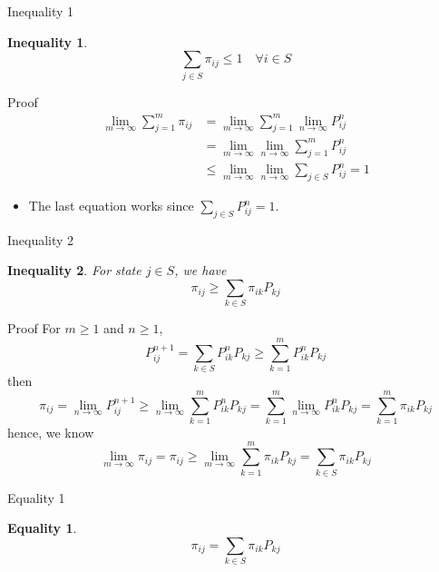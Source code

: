 \documentclass[mathserif]{beamer}
\newtheorem{ineq}{Inequality}
\newtheorem{eq}{Equality}
\begin{document}
\begin{frame}{Inequality 1}
	\begin{ineq}
		\[
		\sum_{j \in S} \pi_{ij} \leq 1 \quad\forall i \in S
		\]
	\end{ineq}
\end{frame}

\begin{frame}{Proof}
		\begin{align*}
			\lim_{m \to \infty} \sum_{j=1}^m \pi_{ij} &= \lim_{m \to \infty} \sum_{j=1}^m \lim_{n \to \infty} P^n_{ij} \\
			&= \lim_{m \to \infty} \lim_{n \to \infty} \sum_{j=1}^m P^n_{ij} \\
			&\leq \lim_{m \to \infty} \lim_{n \to \infty} \sum_{j \in S} P^n_{ij} = 1
		\end{align*}
	\begin{itemize}
		\item The last equation works since $\sum_{j \in S} P^n_{ij} = 1$.
	\end{itemize}
\end{frame}

\begin{frame}{Inequality 2}
	\begin{ineq}
		For state $j \in S$, we have
		\[
		\pi_{ij} \geq \sum_{k \in S} \pi_{ik} P_{kj}
		\]
	\end{ineq}
\end{frame}

\begin{frame}{Proof}
	For $m \geq 1$ and $n \geq 1$,
	\[
	P^{n+1}_{ij} = \sum_{k \in S} P^n_{ik} P_{kj} \geq \sum_{k=1}^m P^n_{ik} P_{kj}
	\]
	then
	\[
	\pi_{ij} = \lim_{n \to \infty} P^{n+1}_{ij}
		\geq \lim_{n \to \infty} \sum_{k=1}^m P^n_{ik} P_{kj} 
		 = \sum_{k=1}^m \lim_{n \to \infty} P^n_{ik} P_{kj} 
		 = \sum_{k=1}^m \pi_{ik} P_{kj}
	\]
	hence, we know
	\[
	\lim_{m\to\infty} \pi_{ij} = \pi_{ij} \geq 
	\lim_{m\to\infty}\sum_{k=1}^m \pi_{ik}P_{kj} = \sum_{k\in S} \pi_{ik}P_{kj}
	\]
\end{frame}

\begin{frame}{Equality 1}
	\begin{eq}
		\[
		\pi_{ij} = \sum_{k \in S} \pi_{ik} P_{kj}
		\]
	\end{eq}
\end{frame}
\end{document}
